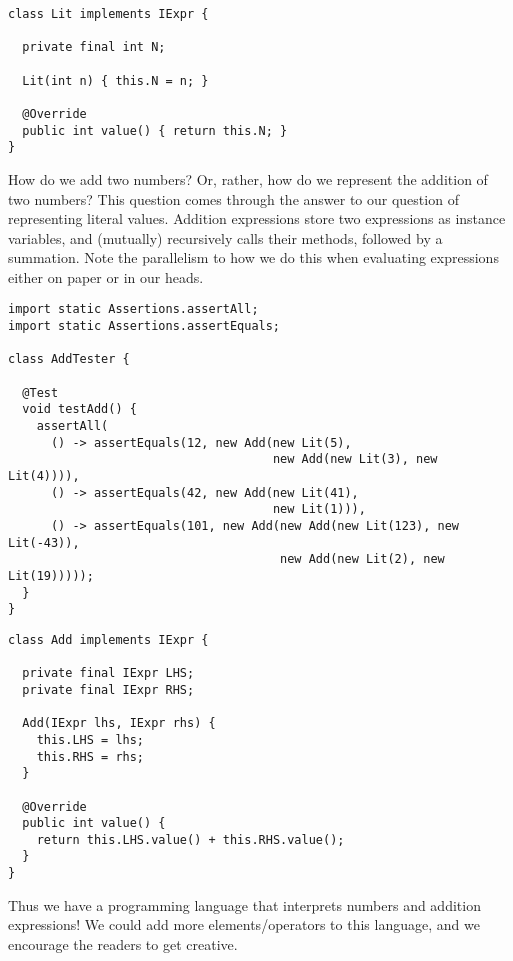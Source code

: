 \begin{lstlisting}[language=MyJava]
class Lit implements IExpr {

  private final int N;

  Lit(int n) { this.N = n; }

  @Override
  public int value() { return this.N; }
}
\end{lstlisting}

How do we add two numbers? Or, rather, how do we represent the addition of two numbers? This question comes through the answer to our question of representing literal values. Addition expressions store two  expressions as instance variables, and (mutually) recursively calls their  methods, followed by a summation. Note the parallelism to how we do this when evaluating expressions either on paper or in our heads.

\begin{lstlisting}[language=MyJava]
import static Assertions.assertAll;
import static Assertions.assertEquals;

class AddTester {

  @Test
  void testAdd() {
    assertAll(
      () -> assertEquals(12, new Add(new Lit(5), 
                                     new Add(new Lit(3), new Lit(4)))),
      () -> assertEquals(42, new Add(new Lit(41), 
                                     new Lit(1))),
      () -> assertEquals(101, new Add(new Add(new Lit(123), new Lit(-43)),
                                      new Add(new Lit(2), new Lit(19)))));
  }
}
\end{lstlisting}

\begin{lstlisting}[language=MyJava]
class Add implements IExpr {

  private final IExpr LHS;
  private final IExpr RHS;

  Add(IExpr lhs, IExpr rhs) {
    this.LHS = lhs;
    this.RHS = rhs;
  }

  @Override
  public int value() { 
    return this.LHS.value() + this.RHS.value(); 
  }
}
\end{lstlisting}
Thus we have a programming language that interprets numbers and addition expressions! We could add more elements/operators to this language, and we encourage the readers to get creative.


